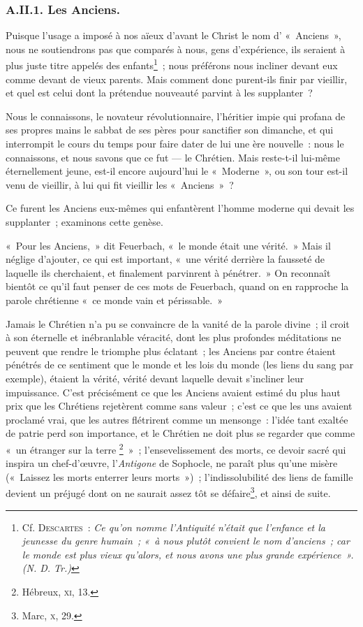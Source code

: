 \documentclass[french,twoside]{book} %
\begin{document}
\subsubsection[{A.II.1. Les Anciens.}]{A.II.1. Les Anciens.}
\noindent Puisque l’usage a imposé à nos aïeux d’avant le Christ le nom d’ « Anciens », nous ne soutiendrons pas que comparés à nous, gens d’expérience, ils seraient à plus juste titre appelés des enfants\footnote{ \noindent Cf. D{\scshape escartes} : \emph{Ce qu’on nomme l’Antiquité n’était que l’enfance et la jeunesse du genre humain ; « à nous plutôt convient le nom d’anciens ; car le monde est plus vieux qu’alors, et nous avons une plus grande expérience ». (N. D. Tr.)}
 } ; nous  préférons nous incliner devant eux comme devant de vieux parents. Mais comment donc purent-ils finir par vieillir, et quel est celui dont la prétendue nouveauté parvint à les supplanter ?\par
Nous le connaissons, le novateur révolutionnaire, l’héritier impie qui profana de ses propres mains le sabbat de ses pères pour sanctifier son dimanche, et qui interrompit le cours du temps pour faire dater de lui une ère nouvelle : nous le connaissons, et nous savons que ce fut — le Chrétien. Mais reste-t-il lui-même éternellement jeune, est-il encore aujourd’hui le « Moderne », ou son tour est-il venu de vieillir, à lui qui fit vieillir les « Anciens » ?\par
Ce furent les Anciens eux-mêmes qui enfantèrent l’homme moderne qui devait les supplanter ; examinons cette genèse.\par
« Pour les Anciens, » dit Feuerbach, « le monde était une vérité. » Mais il néglige d’ajouter, ce qui est important, « une vérité derrière la fausseté de laquelle ils cherchaient, et finalement parvinrent à pénétrer. » On reconnaît bientôt ce qu’il faut penser de ces mots de Feuerbach, quand on en rapproche la parole chrétienne « ce monde vain et périssable. »\par
Jamais le Chrétien n’a pu se convaincre de la vanité de la parole divine ; il croit à son éternelle et inébranlable véracité, dont les plus profondes méditations ne peuvent que rendre le triomphe plus éclatant ; les Anciens par contre étaient pénétrés de ce sentiment que le monde et les lois du monde (les liens du sang par exemple), étaient la vérité, vérité devant laquelle devait s’incliner leur impuissance. C’est précisément ce que les Anciens avaient estimé du plus haut prix que les Chrétiens rejetèrent comme sans valeur ; c’est ce que les uns avaient proclamé  vrai, que les autres flétrirent comme un mensonge : l’idée tant exaltée de patrie perd son importance, et le Chrétien ne doit plus se regarder que comme « un étranger sur la terre \footnote{ \noindent Hébreux, {\scshape xi}, 13.
 } » ; l’ensevelissement des morts, ce devoir sacré qui inspira un chef-d’œuvre, l’\emph{Antigone} de Sophocle, ne paraît plus qu’une misère (« Laissez les morts enterrer leurs morts ») ; l’indissolubilité des liens de famille devient un préjugé dont on ne saurait assez tôt se défaire\footnote{ \noindent Marc, {\scshape x}, 29.
 }, et ainsi de suite.\par
\end{document}
